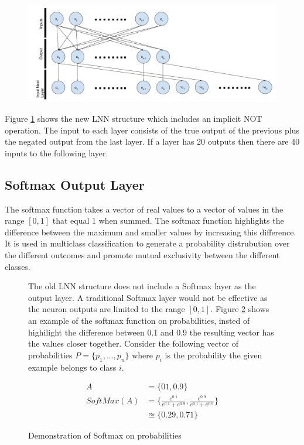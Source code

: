 \begin{figure}[H]
	\centering
	\begin{minipage}[b]{0.9\textwidth}
		\includegraphics[width=\textwidth]{Modified-LNN-Structure.png}
		\caption{}
		\label{fig:modified-lnn-structure}
	\end{minipage}
	\hfill
\end{figure}

Figure \ref{fig:modified-lnn-structure} shows the new LNN structure which includes an implicit NOT operation. The input to each layer consists of the true output of the previous plus the negated output from the last layer. If a layer has 20 outputs then there are 40 inputs to the following layer.
\subsection{Softmax Output Layer}
The softmax function takes a vector of real values to a vector of values in the range $[0,1]$ that equal 1 when summed. The softmax function highlights the difference between the maximum and smaller values by increasing this difference. It is used in multiclass classification to generate a probability distrubution over the different outcomes and promote mutual exclusivity between the different classes.
\begin{figure}[H]
\begin{minipage}[t]{0.57\textwidth}
	\vspace{0px}
	The old LNN structure does not include a Softmax layer as the output layer. A traditional Softmax layer would not be effective as the neuron outputs are limited to the range $[0,1]$. Figure \ref{fig:softmax-failure} shows an example of the softmax function on probabilities, insted of highilight the difference between 0.1 and 0.9 the resulting vector has the values closer together. Consider the following vector of probabilities $P = \{p_1, ..., p_n\}$ where $p_i$ is the probability the given example belongs to class $i$.
\end{minipage}
\hspace{3px}
\begin{minipage}[t]{0.4\textwidth}
\vspace{0px}
	\begin{align*}
		A &= \{01, 0.9\}\\
		SoftMax(A) &= \{ \frac{e^{0.1}}{e^{0.1} + e^{0.9}}, \frac{e^{0.9}}{e^{0.1} + e^{0.9}} \}\\
		&\approxeq \{ 0.29, 0.71 \}
	\end{align*}
\caption{Demonstration of Softmax on probabilities}
\label{fig:softmax-failure}

\end{minipage}
\end{figure}

